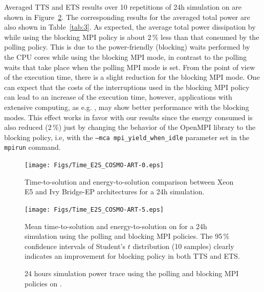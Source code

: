 Averaged TTS and ETS results over 10 repetitions of 24h simulation on \tinto are shown in Figure~\ref{fig:4}. The corresponding results for the averaged total power are also shown in Table~\ref{tab:3}.  
As expected, the average total power dissipation by \cosmoart while using the blocking MPI policy is about 2\,\% less than that consumed by the polling policy. This is due to the power-friendly (blocking) waits performed by the CPU cores while using the blocking MPI mode, in contrast to the polling waits that take place when the polling MPI mode is set. From the point of view of the execution time, there is a slight reduction for the blocking MPI mode. One can expect that the costs of the interruptions used in the blocking MPI policy can lead to an increase of the execution time, however, applications with extensive computing, as e.g. \cosmoart, may show better performance with the blocking modes. This effect works in favor with our results since the energy consumed is also reduced (2\,\%) just by changing the behavior of the OpenMPI library to the blocking policy, i.e, with the \texttt{--mca mpi\_yield\_when\_idle} parameter set in the \texttt{mpirun} command.

\begin{figure}[htbf]
  \centering
  \texttt{[image: Figs/Time\_E2S\_COSMO-ART-0.eps]}
  \caption{Time-to-solution and energy-to-solution comparison between
    Xeon E5 and Ivy Bridge-EP architectures for a 24h simulation.}
  \label{fig:3}
\end{figure}

\begin{figure}[htbf]

  \centering
  \texttt{[image: Figs/Time\_E2S\_COSMO-ART-5.eps]}
  \vspace{-1cm}
  \caption{Mean time-to-solution and energy-to-solution on
    \tinto for a 24h simulation using the polling and blocking MPI policies. The 95\,\% confidence intervals of Student's $t$ distribution (10 samples) clearly indicates 
    an improvement for blocking policy in both TTS and ETS.}
  \label{fig:4}
\end{figure}

\begin{figure}[ht]
  \centering
  \hspace{0.6cm}
  \scalebox{0.64}{}
  \caption{24 hours simulation power trace using the polling and blocking MPI policies on \tinto.}
  \label{fig:9}
\end{figure}


